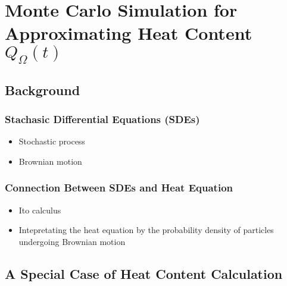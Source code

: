 \section{Monte Carlo Simulation for Approximating Heat Content $Q_{\Omega}(t)$}


  \subsection{Background \cite{jacobs2010stochastic}}
    \subsubsection{Stachasic Differential Equations (SDEs)}
      \begin{itemize}
        \item Stochastic process
        \item Brownian motion
      \end{itemize}
      
    \subsubsection{Connection Between SDEs and Heat Equation}
      \begin{itemize}
        \item Ito calculus
        \item Intepretating the heat equation by the probability density of particles undergoing Brownian motion
      \end{itemize}
      
  \subsection{A Special Case of Heat Content Calculation}

